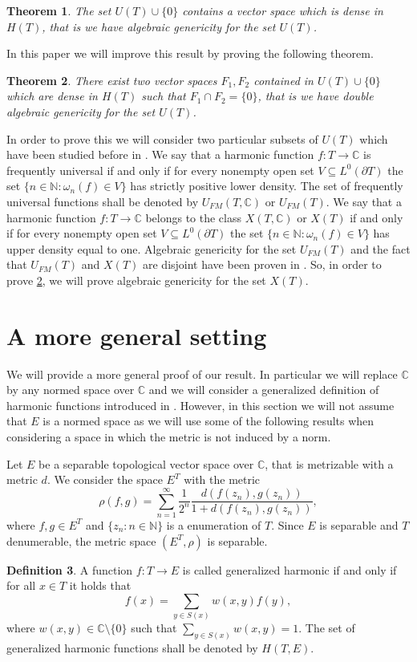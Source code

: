 \documentclass[twoside, 11pt]{article}
\newcommand{\C}{\mathbb{C}}
\newcommand{\N}{\mathbb{N}}
\theoremstyle{plain}
\newtheorem{theorem}{Theorem}[section]
\theoremstyle{definition}
\newtheorem{definition}[theorem]{Definition}
\begin{document}
\begin{theorem}
The set $U(T) \cup \{0\}$ contains a vector space which is dense in $H(T)$, that is we have algebraic genericity for the set $U(T)$.
\end{theorem}

In this paper we will improve this result by proving the following theorem.

\begin{theorem}
\label{thm:wanted}
There exist two vector spaces $F_1,F_2$ contained in $U(T)\cup\{0\}$ which are dense in $H(T)$ such that $F_1 \cap F_2 = \{0\}$, that is we have double algebraic genericity for the set $U(T)$.
\end{theorem}

In order to prove this we will consider two particular subsets of $U(T)$ which have been studied before in \cite{ABAKUMOV2,ABAKUMOV1,BIEHLER2,BIEHLER1}.
We say that a harmonic function $f:T \to \C$ is frequently universal if and only if for every nonempty open set $V \subseteq L^0(\partial T)$ the set $\{n \in \N: \omega_n(f) \in V \} $ has strictly positive lower density.
The set of frequently universal functions shall be denoted by $U_{FM}(T,\C)$ or $U_{FM}(T)$.
We say that a harmonic function $f:T \to \C$ belongs to the class $X(T,\C)$ or $X(T)$ if and only if for every nonempty open set $V \subseteq L^0(\partial T)$ the set $\{n \in \N: \omega_n(f) \in V \} $ has upper density equal to one.
Algebraic genericity for the set $U_{FM}(T)$ and the fact that $U_{FM}(T)$ and $X(T)$ are disjoint have been proven in \cite{BIEHLER1}.
So, in order to prove \cref{thm:wanted}, we will prove algebraic genericity for the set $X(T)$.

\section{A more general setting}
We will provide a more general proof of our result.
In particular we will replace $\C$ by any normed space over $\C$ and we will consider a generalized definition of harmonic functions introduced in \cite{BIEHLER1}.
However, in this section we will not assume that $E$ is a normed space as we will use some of the following results when considering a space in which the metric is not induced by a norm.

Let $E$ be a separable topological vector space over $\C$, that is metrizable with a metric $d$.
We consider the space $E^T$ with the metric
$$\rho(f,g) = \sum_{n=1}^{\infty}{\frac{1}{2^n}\frac{d(f(z_n), g(z_n))}{1+d(f(z_n), g(z_n))}},$$
where $f,g \in E^T$ and $\{z_n : n\in \N\}$ is a enumeration of $T$.
Since $E$ is separable and $T$ denumerable, the metric space $(E^T, \rho)$ is separable.
\begin{definition}
A function $f:T \to E$ is called generalized harmonic if and only if for all $x \in T$ it holds that
$$f(x) = \sum_{y \in S(x)}{w(x,y)f(y)},$$
where $w(x,y) \in \C\setminus \{0\}$ such that $\sum_{y \in S(x)}{w(x,y)} = 1$. The set of generalized harmonic functions shall be denoted by $H(T,E)$.
\end{definition}
\end{document}
